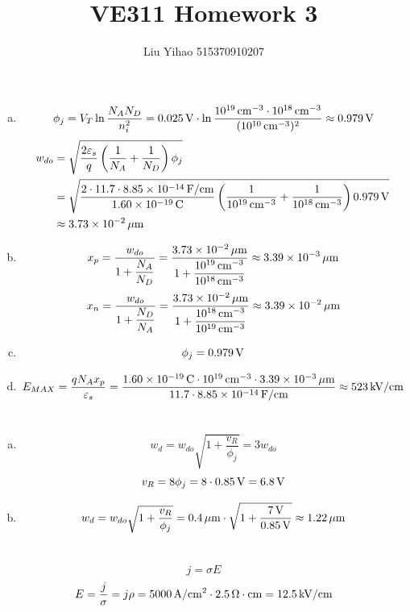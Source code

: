 \documentclass{article}
\title{VE311 Homework 3}
\author{Liu Yihao 515370910207}
\date{}
\newcommand{\Omegacm}{{\rm\,\Omega\cdot cm}}
\newcommand{\unit}[1]{{\rm\,#1}}
\begin{document}
\maketitle

\section{}
\begin{enumerate}[(a)]
\item
$$\phi_j=V_T\ln\frac{N_AN_D}{n_i^2}=0.025\unit{V}\cdot\ln\frac{10^{19}\unit{cm^{-3}}\cdot10^{18}\unit{cm^{-3}}}{(10^{10}\unit{cm^{-3}})^2}\approx0.979\unit{V}$$
\begin{align*}
w_{do}&=\sqrt{\frac{2\varepsilon_s}{q}\left(\frac{1}{N_A}+\frac{1}{N_D}\right)\phi_j}\\
&=\sqrt{\frac{2\cdot11.7\cdot8.85\times10^{-14}\unit{F/cm}}{1.60\times10^{-19}\unit{C}}\left(\frac{1}{10^{19}\unit{cm^{-3}}}+\frac{1}{10^{18}\unit{cm^{-3}}}\right)0.979\unit{V}}\\
&\approx3.73\times10^{-2}\unit{\mu m}
\end{align*}
\item
$$x_p=\frac{w_{do}}{1+\dfrac{N_A}{N_D}}=\frac{3.73\times10^{-2}\unit{\mu m}}{1+\dfrac{10^{19}\unit{cm^{-3}}}{10^{18}\unit{cm^{-3}}}}\approx3.39\times10^{-3}\unit{\mu m}$$
$$x_n=\frac{w_{do}}{1+\dfrac{N_D}{N_A}}=\frac{3.73\times10^{-2}\unit{\mu m}}{1+\dfrac{10^{18}\unit{cm^{-3}}}{10^{19}\unit{cm^{-3}}}}\approx3.39\times10^{-2}\unit{\mu m}$$
\item
$$\phi_j=0.979\unit{V}$$
\item
$$E_{MAX}=\frac{qN_Ax_p}{\varepsilon_s}=\frac{1.60\times10^{-19}\unit{C}\cdot10^{19}\unit{cm^{-3}}\cdot3.39\times10^{-3}\unit{\mu m}}{11.7\cdot8.85\times10^{-14}\unit{F/cm}}\approx523\unit{kV/cm}$$
\end{enumerate}

\section{}
\begin{enumerate}[(a)]
\item
$$w_d=w_{do}\sqrt{1+\frac{v_R}{\phi_j}}=3w_{do}$$
$$v_R=8\phi_j=8\cdot0.85\unit{V}=6.8\unit{V}$$
\item
$$w_d=w_{do}\sqrt{1+\frac{v_R}{\phi_j}}=0.4\unit{\mu m}\cdot\sqrt{1+\frac{7\unit{V}}{0.85\unit{V}}}\approx1.22\unit{\mu m}$$
\end{enumerate}

\section{}
$$j=\sigma E$$
$$E=\frac{j}{\sigma}=j\rho=5000\unit{A/cm^2}\cdot2.5\Omegacm=12.5\unit{kV/cm}$$
\end{document}
